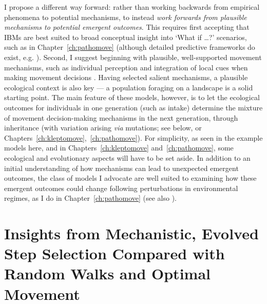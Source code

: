 I propose a different way forward: rather than working backwards from empirical phenomena to potential mechanisms, to instead \textit{work forwards from plausible mechanisms to potential emergent outcomes}.
This requires first accepting that IBMs are best suited to broad conceptual insight into `What if \ldots?' scenarios, such as in Chapter~\ref{ch:pathomove} (although detailed predictive frameworks do exist, e.g. \cite{bocedi2014}).
Second, I suggest beginning with plausible, well-supported movement mechanisms, such as individual perception and integration of local cues when making movement decisions \parencite{nathan2008a}.
Having selected salient mechanisms, a plausible ecological context is also key --- a population foraging on a landscape is a solid starting point.
The main feature of these models, however, is to let the ecological outcomes for individuals in one generation (such as intake) determine the mixture of movement decision-making mechanisms in the next generation, through inheritance (with variation arising \textit{via} mutations; see below, or Chapters~\ref{ch:kleptomove},~\ref{ch:pathomove}).
For simplicity, as seen in the example models here, and in Chapters~\ref{ch:kleptomove} and~\ref{ch:pathomove}, some ecological and evolutionary aspects will have to be set aside.
In addition to an initial understanding of how mechanisms can lead to unexpected emergent outcomes, the class of models I advocate are well suited to examining how these emergent outcomes could change following perturbations in environmental regimes, as I do in Chapter~\ref{ch:pathomove} (see also \cite{botero2015}).

\section*{Insights from Mechanistic, Evolved Step Selection Compared with Random Walks and Optimal Movement}

